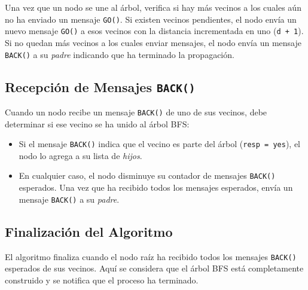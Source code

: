 Una vez que un nodo se une al árbol, verifica si hay más vecinos a los cuales aún no ha enviado un mensaje \texttt{GO()}. Si existen vecinos pendientes, el nodo envía un nuevo mensaje \texttt{GO()} a esos vecinos con la distancia incrementada en uno (\texttt{d + 1}). Si no quedan más vecinos a los cuales enviar mensajes, el nodo envía un mensaje \texttt{BACK()} a su \textit{padre} indicando que ha terminado la propagación. 
\subsection{Recepción de Mensajes \texttt{BACK()}}

Cuando un nodo recibe un mensaje \texttt{BACK()} de uno de sus vecinos, debe determinar si ese vecino se ha unido al árbol BFS:

\begin{itemize}
	\item Si el mensaje \texttt{BACK()} indica que el vecino es parte del árbol (\texttt{resp = yes}), el nodo lo agrega a su lista de \textit{hijos}.
	\item En cualquier caso, el nodo disminuye su contador de mensajes \texttt{BACK()} esperados. Una vez que ha recibido todos los mensajes esperados, envía un mensaje \texttt{BACK()} a su \textit{padre}. 
\end{itemize}

\subsection{Finalización del Algoritmo}

El algoritmo finaliza cuando el nodo raíz ha recibido todos los mensajes \texttt{BACK()} esperados de sus vecinos. Aquí se considera que el árbol BFS está completamente construido y se notifica que el proceso ha terminado.


